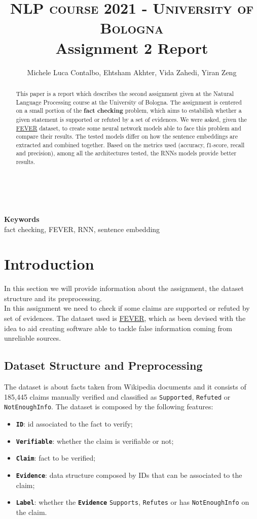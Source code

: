 \documentclass[10pt,twocolumn,letterpaper]{article}
\title{
		\usefont{OT1}{bch}{b}{n}
		\normalfont \normalsize \textsc{NLP course 2021 - University of Bologna} \\ [10pt]
		\huge Assignment 2 Report \\
}
\author{Michele Luca Contalbo, Ehtsham Akhter, Vida Zahedi, Yiran Zeng}
\begin{document}
\maketitle

\begin{abstract}
This paper is a report which describes the second assignment given at the Natural Language Processing course at the University of Bologna. The assignment is centered on a small portion of the \textbf{fact checking} problem, which aims to estabilish whether a given statement is supported or refuted by a set of evidences. We were asked, given the \href{https://fever.ai/}{FEVER} dataset, to create some neural network models able to face this problem and compare their results. The tested models differ on how the sentence embeddings are extracted and combined together. Based on the metrics used (accuracy, f1-score, recall and precision), among all the architectures tested, the RNNs models provide better results.
\end{abstract} \\ 
\\ 
{\textbf{Keywords} \\
fact checking, FEVER, RNN, sentence embedding}

\section{Introduction}
In this section we will provide information about the assignment, the dataset structure and its preprocessing.\\
In this assignment we need to check if some claims are supported or refuted by set of evidences. The dataset used is \href{https://fever.ai/}{FEVER}, which as been devised with the idea to aid creating software able to tackle false information coming from unreliable sources. 

\subsection{Dataset Structure and Preprocessing}
The dataset is about facts taken from Wikipedia documents and it consists of 185,445 claims manually verified and classified as \texttt{Supported}, \texttt{Refuted} or \texttt{NotEnoughInfo}.
The dataset is composed by the following features:
\begin{itemize}
\item \texttt{\textbf{ID}}: id associated to the fact to verify;
\item \texttt{\textbf{Verifiable}}: whether the claim is verifiable or not;
\item \texttt{\textbf{Claim}}: fact to be verified;
\item \texttt{\textbf{Evidence}}: data structure composed by IDs that can be associated to the claim;
\item \texttt{\textbf{Label}}: whether the \texttt{\textbf{Evidence}} \texttt{Supports}, \texttt{Refutes} or has \texttt{NotEnoughInfo} on the claim.
\end{itemize}
\end{document}
